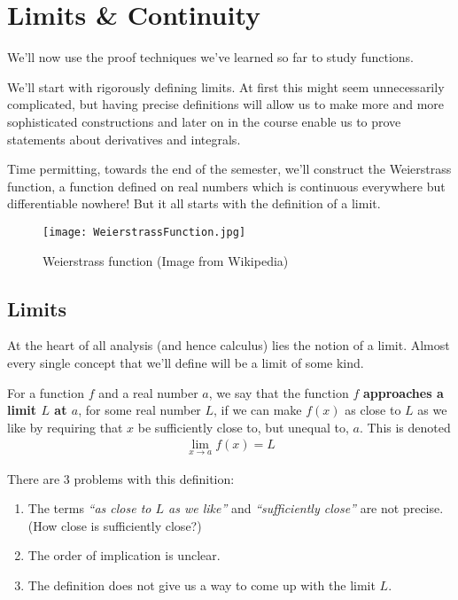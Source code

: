 \section{Limits \& Continuity}

We'll now use the proof techniques we've learned so far to study functions.

We'll start with rigorously defining limits. At first this might seem unnecessarily complicated, but having precise definitions will allow us to make more and more sophisticated constructions and later on in the course enable us to prove statements about derivatives and integrals.

Time permitting, towards the end of the semester, we'll construct the Weierstrass function, a function defined on real numbers which is continuous everywhere but differentiable nowhere! But it all starts with the definition of a limit.

\begin{figure}[H]
	\centering
	\texttt{[image: WeierstrassFunction.jpg]}
	\caption*{Weierstrass function (Image from Wikipedia)}
\end{figure}

\subsection{Limits}
At the heart of all analysis (and hence calculus) lies the notion of a limit. Almost every single concept that we'll define will be a limit of some kind.

\begin{definition}
	\label{def:provisional_definition_limit}
	For a function $f$ and a real number $a$, we say that the function $f$ \textbf{approaches a limit $L$ at $a$}, for some real number $L$, if we can make $f(x)$ as close to $L$ as we like by requiring that $x$ be sufficiently close to, but unequal to, $a$. This is denoted
	\begin{align*}
		\lim \limits _ {x \rightarrow a} f(x) = L
	\end{align*}
\end{definition}
\noindent There are 3 problems with this definition:
\begin{enumerate}
	\item The terms {\it ``as close to $L$ as we like''} and {\it``sufficiently close''} are not precise. (How close is sufficiently close?)
	\item The order of implication is unclear.
	\item The definition does not give us a way to come up with the limit $L$.
\end{enumerate}


